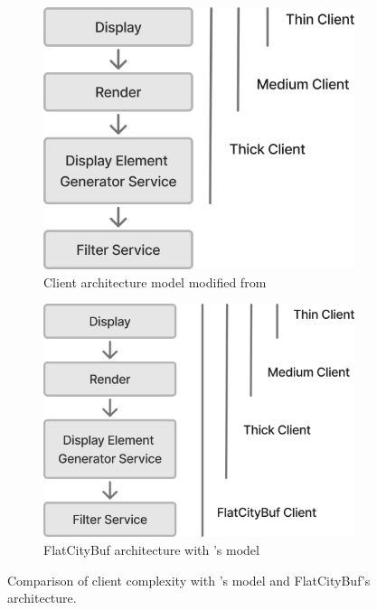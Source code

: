 \begin{figure}[htbp]
  \centering
  \begin{subfigure}[b]{0.45\textwidth}
    \centering
    \includegraphics[width=\textwidth]{figs/discussion/client_architecture1.png}
    \caption{Client architecture model modified from \citet{alesheikh_2002}}
    \label{fig:alesheikh_2002_architecture}
  \end{subfigure}
  \hfill
  \begin{subfigure}[b]{0.45\textwidth}
    \centering
    \includegraphics[width=\textwidth]{figs/discussion/client_architecture2.png}
    \caption{FlatCityBuf architecture with \citet{alesheikh_2002}'s model}
    \label{fig:fcb_thickness}
  \end{subfigure}
  \caption{Comparison of client complexity with \citet{alesheikh_2002}'s model and FlatCityBuf's architecture.}
  \label{fig:thickness_of_client}
\end{figure}


